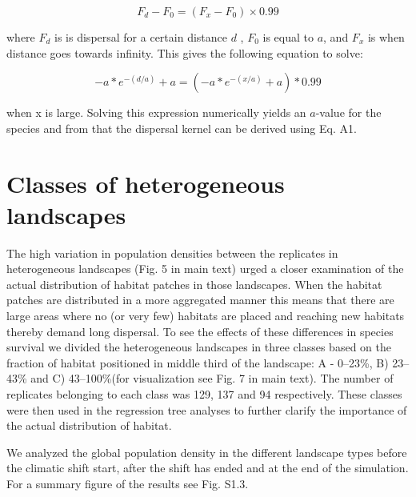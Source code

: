 \documentclass[12pt,pdftex]{article}
\begin{document}
\begin{equation}
F_d - F_0 =  (F_x - F_0) \times 0.99
\end{equation}

where $F_d$ is is dispersal for a certain distance $d$ , $F_0$ is equal to $a$, and $F_x$ is when distance goes towards infinity. This gives the following equation to solve:

\begin{equation}
-a*e^{-(d/a)}+a = (-a*e^{-(x/a)}+a) * 0.99           
\end{equation}
 
when x is large. Solving this expression numerically yields an $a$-value for the species and from that the dispersal kernel can be derived using Eq. A1.



\section*{Classes of heterogeneous landscapes}
The high variation in population densities between the replicates in heterogeneous landscapes (Fig. 5 in main text) urged a closer examination of the actual distribution of habitat patches in those landscapes. When the habitat patches are distributed in a more aggregated manner this means that there are large areas where no (or very few) habitats are placed and reaching new habitats thereby demand long dispersal. To see the effects of these differences in species survival we divided the heterogeneous landscapes in three classes based on the fraction of habitat positioned in middle third of the landscape: A - 0--23\%, B) 23--43\%  and C) 43--100\%(for visualization see Fig. 7 in main text). The number of replicates belonging to each class was 129, 137 and 94 respectively. These classes were then used in the regression tree analyses to further clarify the importance of the actual distribution of habitat. 

We analyzed the global population density in the different landscape types before the climatic shift start, after the shift has ended and at the end of the simulation. For a summary figure of the results see Fig. S1.3.
 
\clearpage



\end{document}
